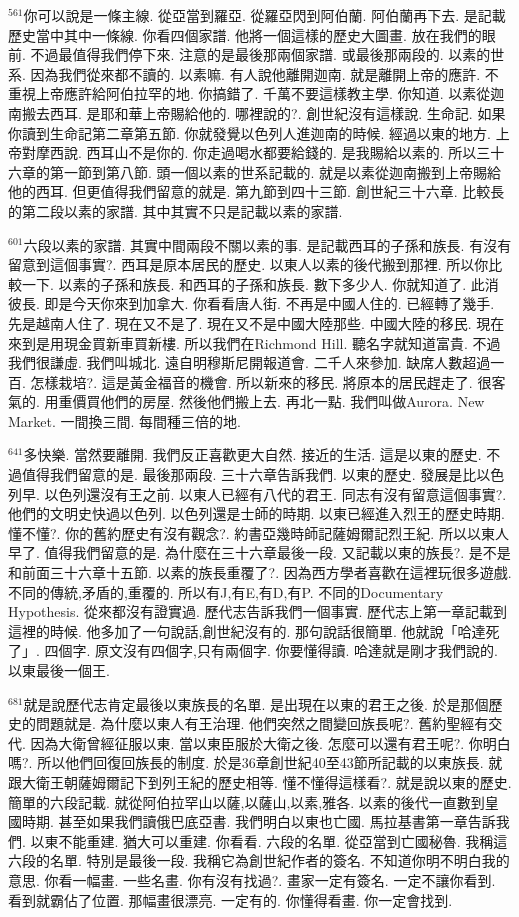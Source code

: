 \documentclass{book}
\begin{document}
$^{561}$你可以說是一條主線.
從亞當到羅亞.
從羅亞閃到阿伯蘭.
阿伯蘭再下去.
是記載歷史當中其中一條線.
你看四個家譜.
他將一個這樣的歷史大圖畫.
放在我們的眼前.
不過最值得我們停下來.
注意的是最後那兩個家譜.
或最後那兩段的.
以素的世系.
因為我們從來都不讀的.
以素嘛.
有人說他離開迦南.
就是離開上帝的應許.
不重視上帝應許給阿伯拉罕的地.
你搞錯了.
千萬不要這樣教主學.
你知道.
以素從迦南搬去西耳.
是耶和華上帝賜給他的.
哪裡說的?.
創世紀沒有這樣說.
生命記.
如果你讀到生命記第二章第五節.
你就發覺以色列人進迦南的時候.
經過以東的地方.
上帝對摩西說.
西耳山不是你的.
你走過喝水都要給錢的.
是我賜給以素的.
所以三十六章的第一節到第八節.
頭一個以素的世系記載的.
就是以素從迦南搬到上帝賜給他的西耳.
但更值得我們留意的就是.
第九節到四十三節.
創世紀三十六章.
比較長的第二段以素的家譜.
其中其實不只是記載以素的家譜.

$^{601}$六段以素的家譜.
其實中間兩段不關以素的事.
是記載西耳的子孫和族長.
有沒有留意到這個事實?.
西耳是原本居民的歷史.
以東人以素的後代搬到那裡.
所以你比較一下.
以素的子孫和族長.
和西耳的子孫和族長.
數下多少人.
你就知道了.
此消彼長.
即是今天你來到加拿大.
你看看唐人街.
不再是中國人住的.
已經轉了幾手.
先是越南人住了.
現在又不是了.
現在又不是中國大陸那些.
中國大陸的移民.
現在來到是用現金買新車買新樓.
所以我們在Richmond Hill.
聽名字就知道富貴.
不過我們很謙虛.
我們叫城北.
遠自明穆斯尼開報道會.
二千人來參加.
缺席人數超過一百.
怎樣栽培?.
這是黃金福音的機會.
所以新來的移民.
將原本的居民趕走了.
很客氣的.
用重價買他們的房屋.
然後他們搬上去.
再北一點.
我們叫做Aurora.
New Market.
一間換三間.
每間種三倍的地.

$^{641}$多快樂.
當然要離開.
我們反正喜歡更大自然.
接近的生活.
這是以東的歷史.
不過值得我們留意的是.
最後那兩段.
三十六章告訴我們.
以東的歷史.
發展是比以色列早.
以色列還沒有王之前.
以東人已經有八代的君王.
同志有沒有留意這個事實?.
他們的文明史快過以色列.
以色列還是士師的時期.
以東已經進入烈王的歷史時期.
懂不懂?.
你的舊約歷史有沒有觀念?.
約書亞幾時師記薩姆爾記烈王紀.
所以以東人早了.
值得我們留意的是.
為什麼在三十六章最後一段.
又記載以東的族長?.
是不是和前面三十六章十五節.
以素的族長重覆了?.
因為西方學者喜歡在這裡玩很多遊戲.
不同的傳統,矛盾的,重覆的.
所以有J,有E,有D,有P.
不同的Documentary Hypothesis.
從來都沒有證實過.
歷代志告訴我們一個事實.
歷代志上第一章記載到這裡的時候.
他多加了一句說話,創世紀沒有的.
那句說話很簡單.
他就說「哈達死了」.
四個字.
原文沒有四個字,只有兩個字.
你要懂得讀.
哈達就是剛才我們說的.
以東最後一個王.

$^{681}$就是說歷代志肯定最後以東族長的名單.
是出現在以東的君王之後.
於是那個歷史的問題就是.
為什麼以東人有王治理.
他們突然之間變回族長呢?.
舊約聖經有交代.
因為大衛曾經征服以東.
當以東臣服於大衛之後.
怎麼可以還有君王呢?.
你明白嗎?.
所以他們回復回族長的制度.
於是36章創世紀40至43節所記載的以東族長.
就跟大衛王朝薩姆爾記下到列王紀的歷史相等.
懂不懂得這樣看?.
就是說以東的歷史.
簡單的六段記載.
就從阿伯拉罕山以薩,以薩山,以素,雅各.
以素的後代一直數到皇國時期.
甚至如果我們讀俄巴底亞書.
我們明白以東也亡國.
馬拉基書第一章告訴我們.
以東不能重建.
猶大可以重建.
你看看.
六段的名單.
從亞當到亡國秘魯.
我稱這六段的名單.
特別是最後一段.
我稱它為創世紀作者的簽名.
不知道你明不明白我的意思.
你看一幅畫.
一些名畫.
你有沒有找過?.
畫家一定有簽名.
一定不讓你看到.
看到就霸佔了位置.
那幅畫很漂亮.
一定有的.
你懂得看畫.
你一定會找到.
\end{document}
